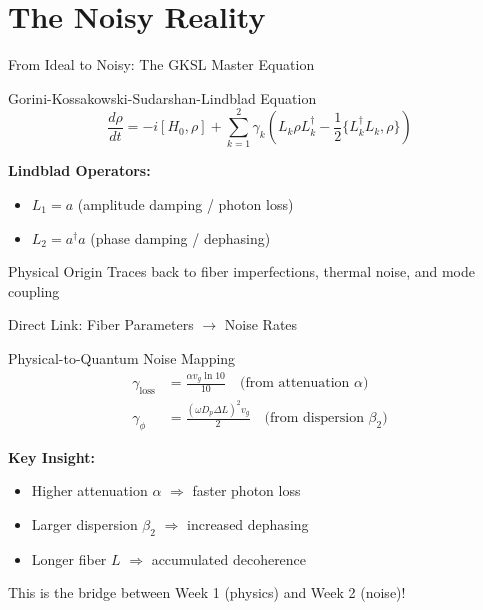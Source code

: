 \documentclass[aspectratio=169,12pt]{beamer}
\begin{document}
\section{The Noisy Reality}

\begin{frame}{From Ideal to Noisy: The GKSL Master Equation}
\begin{alertblock}{Gorini-Kossakowski-Sudarshan-Lindblad Equation}
\begin{equation*}
\frac{d\rho}{dt} = -i[H_0, \rho] + \sum_{k=1}^2 \gamma_k \left( L_k \rho L_k^\dagger - \frac{1}{2} \{ L_k^\dagger L_k, \rho \} \right)
\end{equation*}
\end{alertblock}

\vspace{0.3cm}

\textbf{Lindblad Operators:}
\begin{itemize}
\item $L_1 = a$ \quad (amplitude damping / photon loss)
\item $L_2 = a^\dagger a$ \quad (phase damping / dephasing)
\end{itemize}

\vspace{0.3cm}

\begin{block}{Physical Origin}
Traces back to fiber imperfections, thermal noise, and mode coupling
\end{block}
\end{frame}

\begin{frame}{Direct Link: Fiber Parameters $\to$ Noise Rates}
\begin{alertblock}{Physical-to-Quantum Noise Mapping}
\begin{align*}
\gamma_{\text{loss}} &= \frac{\alpha v_g \ln 10}{10} \quad \text{(from attenuation $\alpha$)} \\[0.3cm]
\gamma_{\phi} &= \frac{(\omega D_p \Delta L)^2 v_g}{2} \quad \text{(from dispersion $\beta_2$)}
\end{align*}
\end{alertblock}

\vspace{0.3cm}

\textbf{Key Insight:}
\begin{itemize}
\item Higher attenuation $\alpha$ $\Rightarrow$ faster photon loss
\item Larger dispersion $\beta_2$ $\Rightarrow$ increased dephasing
\item Longer fiber $L$ $\Rightarrow$ accumulated decoherence
\end{itemize}

\vspace{0.2cm}

\begin{block}{This is the bridge between Week 1 (physics) and Week 2 (noise)!}
\end{block}
\end{frame}
\end{document}
